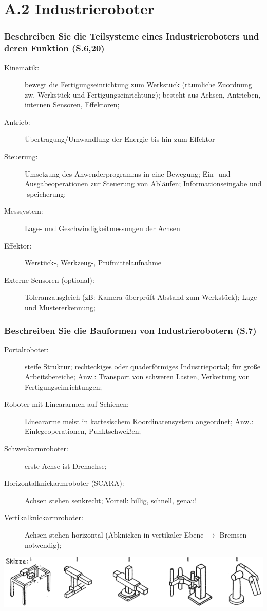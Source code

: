 \section{A.2 Industrieroboter}

\subsubsection*{Beschreiben Sie die Teilsysteme eines Industrieroboters und deren Funktion 
  (S.6,20)}
\begin{description}
\item[Kinematik:] bewegt die Fertigungseinrichtung zum Werkstück (räumliche Zuordnung zw. 
  Werkstück und Fertigungseinrichtung); besteht aus Achsen, Antrieben, internen Sensoren, 
  Effektoren;
\item[Antrieb:] Übertragung/Umwandlung der Energie bis hin zum Effektor
\item[Steuerung:] Umsetzung des Anwenderprogramms in eine Bewegung; Ein- und Ausgabeoperationen
  zur Steuerung von Abläufen; Informationseingabe und -speicherung;
\item[Messsystem:] Lage- und Geschwindigkeitmessungen der Achsen
\item[Effektor:] Werstück-, Werkzeug-, Prüfmittelaufnahme
\item[Externe Sensoren (optional):] Toleranzausgleich (zB: Kamera überprüft Abstand zum 
  Werkstück); Lage- und Mustererkennung; 
\end{description}

\subsubsection*{Beschreiben Sie die Bauformen von Industrierobotern (S.7)}
\begin{description}
\item[Portalroboter:] steife Struktur; rechteckiges oder quaderförmiges Industrieportal; 
  für große Arbeitsbereiche; Anw.: Transport von schweren Lasten, Verkettung von 
  Fertigungseinrichtungen;
\item[Roboter mit Lineararmen auf Schienen:] Lineararme meist in kartesischem Koordinatensystem
  angeordnet; Anw.: Einlegeoperationen, Punktschweißen;
\item[Schwenkarmroboter:] erste Achse ist Drehachse;
\item[Horizontalknickarmroboter (SCARA):] Achsen stehen senkrecht; Vorteil: billig, schnell, 
  genau!
\item[Vertikalknickarmroboter:] Achsen stehen horizontal (Abknicken in vertikaler Ebene 
  $\rightarrow$ Bremsen notwendig);
\end{description}
\includegraphics[width=\textwidth]{pics/bauarten}

